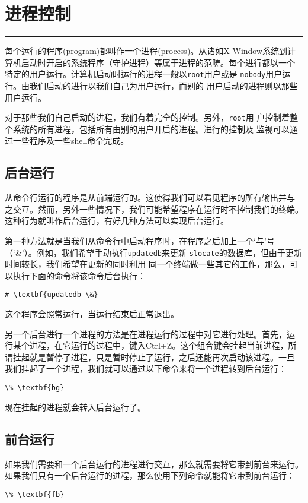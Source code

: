 
\chapter{进程控制}
\label{chap:processControl}

\begin{flushleft}
\rule[0mm]{\textwidth}{.1pt}
\end{flushleft}

每个运行的程序(program)都叫作一个进程(process)。从诸如X Window系统到计
算机启动时开启的系统程序（守护进程）等属于进程的范畴。每个进行都以一个
特定的用户运行。计算机启动时运行的进程一般以\texttt{root}用户或是
\texttt{nobody}用户运行。由我们启动的进行以我们自己为用户运行，而别的
用户启动的进程则以那些用户运行。

对于那些我们自己启动的进程，我们有着完全的控制。另外，\texttt{root}用
户控制着整个系统的所有进程，包括所有由别的用户开启的进程。进行的控制及
监视可以通过一些程序及一些shell命令完成。

\section{后台运行}
\label{sec:processControl:backgrounding}
从命令行运行的程序是从前端运行的。这使得我们可以看见程序的所有输出并与
之交互。然而，另外一些情况下，我们可能希望程序在运行时不控制我们的终端。
这种行为就叫作后台运行，有好几种方法可以实现后台运行。

第一种方法就是当我们从命令行中启动程序时，在程序之后加上一个`与'号
（`\&'）。例如，我们希望手动执行\texttt{updatedb}来更新
\texttt{slocate}的数据库，但由于更新时间较长，我们希望在更新的同时利用
同一个终端做一些其它的工作，那么，可以执行下面的命令将该命令后台执行：
\begin{Verbatim}[frame=single, commandchars=\\\{\}]
# \textbf{updatedb \&}
\end{Verbatim}
这个程序会照常运行，当运行结束后正常退出。

另一个后台进行一个进程的方法是在进程运行的过程中对它进行处理。首先，运
行某个进程，在它运行的过程中，键入Ctrl+Z。这个组合键会挂起当前进程，所
谓挂起就是暂停了进程，只是暂时停止了运行，之后还能再次启动该进程。一旦
我们挂起了一个进程，我们就可以通过以下命令来将一个进程转到后台运行：
\begin{Verbatim}[frame=single, commandchars=\\\{\}]
\% \textbf{bg}
\end{Verbatim}
现在挂起的进程就会转入后台运行了。

\section{前台运行}
\label{sec:processControl:forgrounding}
如果我们需要和一个后台运行的进程进行交互，那么就需要将它带到前台来运行。
如果我们只有一个后台运行的进程，那么使用下列命令就能将它带到前台运行：
\begin{Verbatim}[frame=single, commandchars=\\\{\}]
\% \textbf{fb}
\end{Verbatim}

